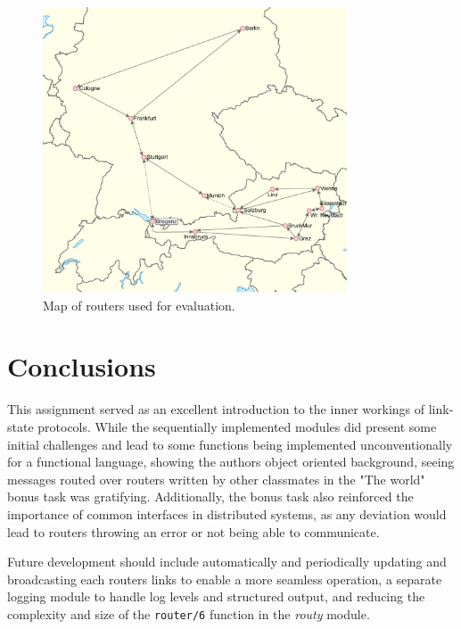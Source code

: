 \documentclass[a4paper, 11pt]{article}
\begin{document}
\begin{figure}[H]
  \begin{center}
    \includegraphics[width=345px]{graphics/map_routy.pdf}
    \caption{Map of routers used for evaluation.}
    \label{fig:map1}
  \end{center}
\end{figure}



\section{Conclusions}

This assignment served as an excellent introduction to the inner workings of link-state protocols.
While the sequentially implemented modules did present some initial challenges and lead to some functions being implemented unconventionally for a functional language, showing the authors object oriented background, seeing messages routed over routers written by other classmates in the "The world" bonus task was gratifying. 
Additionally, the bonus task also reinforced the importance of common interfaces in distributed systems, as any deviation would lead to routers throwing an error or not being able to communicate.

Future development should include automatically and periodically updating and broadcasting each routers links to enable a more seamless operation, a separate logging module to handle log levels and structured output, and reducing the complexity and size of the \texttt{router/6} function in the \textit{routy} module.
\end{document}
